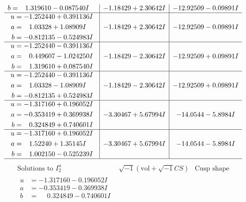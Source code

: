 \documentclass[1p]{elsarticle_modified}
\theoremstyle{definition}
\newcommand{\I}{\sqrt{-1}}
\begin{document}
$$\begin{array}{c|c|c}
\begin{aligned}
b &= \phantom{-}1.319610 - 0.087540 I\end{aligned}
 & -1.18429 + 2.30642 I & -12.92509 - 0.09891 I \\ \hline\begin{aligned}
u &= -1.252440 + 0.391136 I \\
a &= \phantom{-}1.03328 + 1.08909 I \\
b &= -0.812135 - 0.524983 I\end{aligned}
 & -1.18429 + 2.30642 I & -12.92509 - 0.09891 I \\ \hline\begin{aligned}
u &= -1.252440 - 0.391136 I \\
a &= \phantom{-}0.449607 - 1.024250 I \\
b &= \phantom{-}1.319610 + 0.087540 I\end{aligned}
 & -1.18429 - 2.30642 I & -12.92509 + 0.09891 I \\ \hline\begin{aligned}
u &= -1.252440 - 0.391136 I \\
a &= \phantom{-}1.03328 - 1.08909 I \\
b &= -0.812135 + 0.524983 I\end{aligned}
 & -1.18429 - 2.30642 I & -12.92509 + 0.09891 I \\ \hline\begin{aligned}
u &= -1.317160 + 0.196052 I \\
a &= -0.353419 + 0.369938 I \\
b &= \phantom{-}0.324849 + 0.740601 I\end{aligned}
 & -3.30467 + 5.67994 I & -14.0544 - 5.8984 I \\ \hline\begin{aligned}
u &= -1.317160 + 0.196052 I \\
a &= \phantom{-}1.52240 + 1.35145 I \\
b &= \phantom{-}1.002150 - 0.525239 I\end{aligned}
 & -3.30467 + 5.67994 I & -14.0544 - 5.8984 I\\
 \hline 
 \end{array}$$\newpage$$\begin{array}{c|c|c}  
\text{Solutions to }I^u_{2}& \I (\text{vol} + \sqrt{-1}CS) & \text{Cusp shape}\\
 \hline 
\begin{aligned}
u &= -1.317160 - 0.196052 I \\
a &= -0.353419 - 0.369938 I \\
b &= \phantom{-}0.324849 - 0.740601 I\end{aligned}

\end{array}$$
\end{document}
